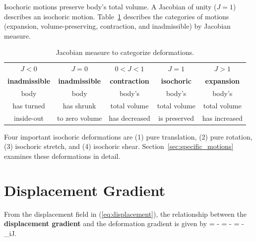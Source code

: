 Isochoric motions preserve body's total volume. A Jacobian of unity ($J=1$) describes an isochoric motion.  Table~\ref{tab:jacobian_categories} describes the categories of motions (expansion, volume-preserving, contraction, and inadmissible) by Jacobian measure.  
\begin{table}[htb]
\caption{Jacobian measure to categorize deformations.}
\label{tab:jacobian_categories}
\begin{center}
\begin{tabular}{|c|c|c|c|c|} \hline
 $J<0$ & $J=0$ & $0<J<1$ & $J=1$ & $J>1$ \\ %
 {\bf inadmissible}
 & {\bf inadmissible}
 & {\bf contraction} 
 & {\bf isochoric} 
 & {\bf expansion} 
 \\ \hline \hline
 body 
 & body 
 & body's  
 & body's 
 & body's
 \\
 has turned 
 & has shrunk 
 & total volume 
 & total volume
 & total volume \\ 
 inside-out 
 & to zero volume 
 & has decreased 
 & is preserved 
 & has increased \\ \hline
\end{tabular}
\end{center}
\end{table}

Four important isochoric deformations are (1) pure translation, (2) pure rotation, (3) isochoric stretch, and (4) isochoric shear. Section~\ref{sec:specific_motions} examines these deformations in detail.

\section{Displacement Gradient}
From the displacement field in (\ref{eq:displacement}), the relationship between the {\bf displacement gradient} and the deformation gradient is given by
\be
\Grad \vu = \Grad \vvarphi - \vid = \tFbold - \vid
\;\; \Longleftrightarrow \;\;
\dst{} = 
\dst{} - 
\delta_{iJ}.
\label{eq:Gradu}
\ee

